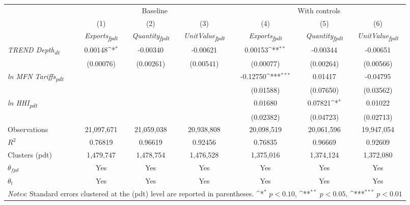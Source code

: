{
\def\sym#1{\ifmmode^{#1}\else\(^{#1}\)\fi}
\begin{tabular}{l*{6}{c}}
\toprule
&\multicolumn{3}{c}{Baseline}&\multicolumn{3}{c}{With controls}\\\cmidrule(lr){2-4}\cmidrule(lr){5-7}
&(1)&(2)&(3)&(4)&(5)&(6)\\
&\textit{Exports\textsubscript{fpdt}}&\textit{Quantity\textsubscript{fpdt}}&\textit{UnitValue\textsubscript{fpdt}}&\textit{Exports\textsubscript{fpdt}}&\textit{Quantity\textsubscript{fpdt}}&\textit{UnitValue\textsubscript{fpdt}}\\
\midrule
\textit{TREND Depth\textsubscript{dt}} & 0.00148\sym{*} & -0.00340 & -0.00621 & 0.00153\sym{**} & -0.00344 & -0.00651\\
 & (0.00076) & (0.00261) & (0.00541) & (0.00077) & (0.00264) & (0.00566)\\
\addlinespace
\textit{ln MFN Tariffs\textsubscript{pdt}} &  &  &  & -0.12750\sym{***} & 0.01417 & -0.04795\\
 &  &  &  & (0.01588) & (0.07650) & (0.03562)\\
\addlinespace
\textit{ln HHI\textsubscript{pdt}} &  &  &  & 0.01680 & 0.07821\sym{*} & 0.01022\\
 &  &  &  & (0.02382) & (0.04723) & (0.02713)\\
\midrule
Observations & 21,097,671 & 21,059,038 & 20,938,808 & 20,098,519 & 20,061,596 & 19,947,054\\
$R^{2}$ & 0.76819 & 0.96619 & 0.92456 & 0.76835 & 0.96669 & 0.92609\\
Clusters (pdt) & 1,479,747 & 1,478,754 & 1,476,528 & 1,375,016 & 1,374,124 & 1,372,080\\
$\theta_{fpd}$ & Yes & Yes & Yes & Yes & Yes & Yes\\
$\theta_{t}$ & Yes & Yes & Yes & Yes & Yes & Yes\\
\bottomrule
\multicolumn{7}{l}{\footnotesize \textit{Notes}: Standard errors clustered at the (pdt) level are reported in parentheses. \sym{*} \(p<0.10\), \sym{**} \(p<0.05\), \sym{***} \(p<0.01\)}\\
\end{tabular}
}
